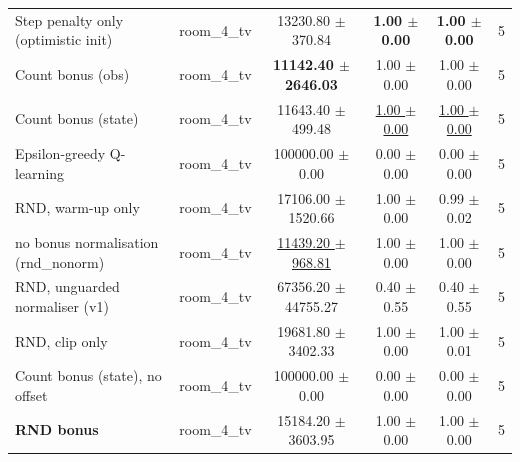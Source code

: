 \begin{tabular}{llcccc}
\midrule
Step penalty only (optimistic init) & room\_4\_tv & 13230.80 $\pm$ 370.84 & \textbf{1.00 $\pm$ 0.00} & \textbf{1.00 $\pm$ 0.00} & 5 \\
Count bonus (obs) & room\_4\_tv & \textbf{11142.40 $\pm$ 2646.03} & 1.00 $\pm$ 0.00 & 1.00 $\pm$ 0.00 & 5 \\
Count bonus (state) & room\_4\_tv & 11643.40 $\pm$ 499.48 & \underline{1.00 $\pm$ 0.00} & \underline{1.00 $\pm$ 0.00} & 5 \\
Epsilon-greedy Q-learning & room\_4\_tv & 100000.00 $\pm$ 0.00 & 0.00 $\pm$ 0.00 & 0.00 $\pm$ 0.00 & 5 \\
RND, warm-up only & room\_4\_tv & 17106.00 $\pm$ 1520.66 & 1.00 $\pm$ 0.00 & 0.99 $\pm$ 0.02 & 5 \\
no bonus normalisation (rnd\_nonorm) & room\_4\_tv & \underline{11439.20 $\pm$ 968.81} & 1.00 $\pm$ 0.00 & 1.00 $\pm$ 0.00 & 5 \\
RND, unguarded normaliser (v1) & room\_4\_tv & 67356.20 $\pm$ 44755.27 & 0.40 $\pm$ 0.55 & 0.40 $\pm$ 0.55 & 5 \\
RND, clip only & room\_4\_tv & 19681.80 $\pm$ 3402.33 & 1.00 $\pm$ 0.00 & 1.00 $\pm$ 0.01 & 5 \\
Count bonus (state), no offset & room\_4\_tv & 100000.00 $\pm$ 0.00 & 0.00 $\pm$ 0.00 & 0.00 $\pm$ 0.00 & 5 \\
\textbf{RND bonus} & room\_4\_tv & 15184.20 $\pm$ 3603.95 & 1.00 $\pm$ 0.00 & 1.00 $\pm$ 0.00 & 5 \\
\bottomrule
\end{tabular}
